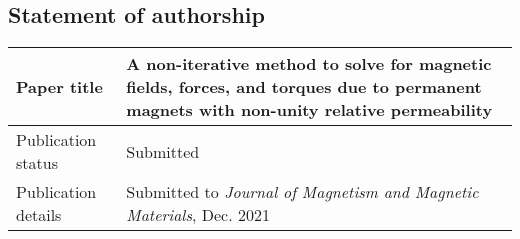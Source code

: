 \subsection*{Statement of authorship}
\renewcommand{\arraystretch}{1.5}
\begin{tabular}{m{} m{}}
    \hline \hline Paper title & A non-iterative method to solve for magnetic fields, forces, and torques due to permanent magnets with non-unity relative permeability \\ \hline
    Publication status & Submitted \\ \hline
    Publication details & Submitted to \textit{Journal of Magnetism and Magnetic Materials}, Dec. 2021 \\ \hline \hline
\end{tabular}

\vfill

